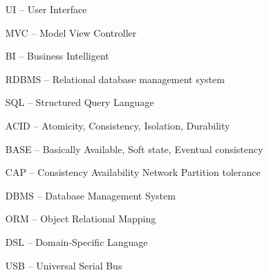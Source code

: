 \begin{itemize}[leftmargin=2cm, topsep=0pt, partopsep=5pt,itemsep=0pt,parsep=0pt]
\item[UI --] User Interface
\item[MVC --] Model View Controller
\item[BI --] Business Intelligent
\item[RDBMS --] Relational database management system
\item[SQL --] Structured Query Language
\item[ACID --] Atomicity, Consistency, Isolation, Durability
\item[BASE --] Basically Available, Soft state, Eventual consistency
\item[CAP --] Consistency Availability Network Partition tolerance
\item[DBMS --] Database Management System
\item[ORM --] Object Relational Mapping
\item[DSL --] Domain-Specific Language
\item[USB --] Universal Serial Bus
\end{itemize}